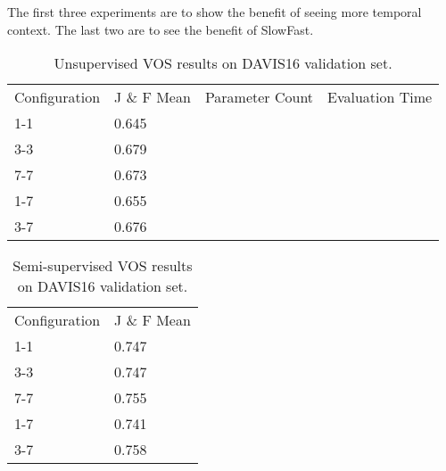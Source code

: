 The first three experiments are to show the benefit of seeing more temporal context. The last two are to see the benefit of SlowFast. 

\begin{table}[]
	\centering
	\begin{tabular}{|l|l|l|l|}
		\cline{1-4}
		Configuration & J \& F Mean & Parameter Count & Evaluation Time\\ \cline{1-4}
		1-1  & 0.645  & & \\ \cline{1-4}
		3-3    & 0.679 & & \\ \cline{1-4}
		7-7    & 0.673 & & \\ \cline{1-4}
		1-7    & 0.655  & & \\ \cline{1-4}
		3-7    & 0.676  & & \\ \cline{1-4}
	\end{tabular}
	\caption{Unsupervised VOS results on DAVIS16 validation set.}
	\label{unsupervised_results}
\end{table}

\begin{table}[]
	\centering
	\begin{tabular}{|l|l|}
		\cline{1-2}
		Configuration & J \& F Mean\\ \cline{1-2}
		1-1  & 0.747  \\ \cline{1-2}
		3-3    & 0.747 \\ \cline{1-2}
		7-7    & 0.755 \\ \cline{1-2}
		1-7    & 0.741  \\ \cline{1-2}
		3-7    & 0.758  \\ \cline{1-2}
	\end{tabular}
	\caption{Semi-supervised VOS results on DAVIS16 validation set.}
	\label{unsupervised_results}
\end{table}
